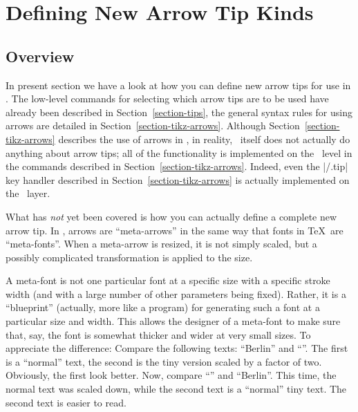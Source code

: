 %
%
%


\section{Defining New Arrow Tip Kinds}
\label{section-arrows}

\subsection{Overview}

In present section we have a look at how you can define new arrow tips for use
in \pgfname. The low-level commands for selecting which arrow tips are to be
used have already been described in Section~\ref{section-tips}, the general
syntax rules for using arrows are detailed in
Section~\ref{section-tikz-arrows}. Although Section~\ref{section-tikz-arrows}
describes the use of arrows in \tikzname, in reality, \tikzname\ itself does
not actually do anything about arrow tips; all of the functionality is
implemented on the \pgfname\ level in the commands described in
Section~\ref{section-tikz-arrows}. Indeed, even the |/.tip| key handler
described in Section~\ref{section-tikz-arrows} is actually implemented on the
\pgfname\ layer.

What has \emph{not} yet been covered is how you can actually define a complete
new arrow tip. In \pgfname, arrows are ``meta-arrows'' in the same way that
fonts in \TeX\ are ``meta-fonts''. When a meta-arrow is resized, it is not
simply scaled, but a possibly complicated transformation is applied to the
size.

A meta-font is not one particular font at a specific size with a specific
stroke width (and with a large number of other parameters being fixed). Rather,
it is a ``blueprint'' (actually, more like a program) for generating such a
font at a particular size and width. This allows the designer of a meta-font to
make sure that, say, the font is somewhat thicker and wider at very small
sizes. To appreciate the difference: Compare the following texts: ``Berlin''
and ``''. The
first is a ``normal'' text, the second is the tiny version scaled by a factor
of two. Obviously, the first look better. Now, compare ``'' and ``{\tiny Berlin}''. This
time, the normal text was scaled down, while the second text is a ``normal''
tiny text. The second text is easier to read.

